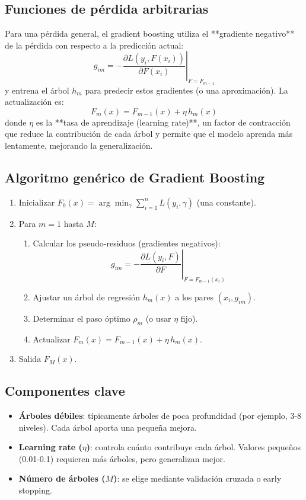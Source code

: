 \documentclass[12pt,a4paper,openany,oneside]{book}
\begin{document}
\subsection{Funciones de pérdida arbitrarias}
Para una pérdida general, el gradient boosting utiliza el **gradiente negativo** de la pérdida con respecto a la predicción actual:
\[
g_{im} = -\left. \frac{\partial L(y_i, F(x_i))}{\partial F(x_i)} \right|_{F=F_{m-1}}
\]
y entrena el árbol \(h_m\) para predecir estos gradientes (o una aproximación). La actualización es:
\[
F_m(x) = F_{m-1}(x) + \eta \, h_m(x)
\]
donde \(\eta\) es la **tasa de aprendizaje (learning rate)**, un factor de contracción que reduce la contribución de cada árbol y permite que el modelo aprenda más lentamente, mejorando la generalización.

\subsection{Algoritmo genérico de Gradient Boosting}
\begin{enumerate}
    \item Inicializar \(F_0(x) = \arg\min_\gamma \sum_{i=1}^n L(y_i, \gamma)\) (una constante).
    \item Para \(m = 1\) hasta \(M\):
    \begin{enumerate}
        \item Calcular los pseudo-residuos (gradientes negativos):
        \[
        g_{im} = -\left. \frac{\partial L(y_i, F)}{\partial F} \right|_{F=F_{m-1}(x_i)}
        \]
        \item Ajustar un árbol de regresión \(h_m(x)\) a los pares \((x_i, g_{im})\).
        \item Determinar el paso óptimo \(\rho_m\) (o usar \(\eta\) fijo).
        \item Actualizar \(F_m(x) = F_{m-1}(x) + \eta \, h_m(x)\).
    \end{enumerate}
    \item Salida \(F_M(x)\).
\end{enumerate}

\subsection{Componentes clave}
\begin{itemize}
    \item \textbf{Árboles débiles}: típicamente árboles de poca profundidad (por ejemplo, 3-8 niveles). Cada árbol aporta una pequeña mejora.
    \item \textbf{Learning rate (\(\eta\))}: controla cuánto contribuye cada árbol. Valores pequeños (0.01-0.1) requieren más árboles, pero generalizan mejor.
    \item \textbf{Número de árboles (\(M\))}: se elige mediante validación cruzada o early stopping.
\end{itemize}
\end{document}
